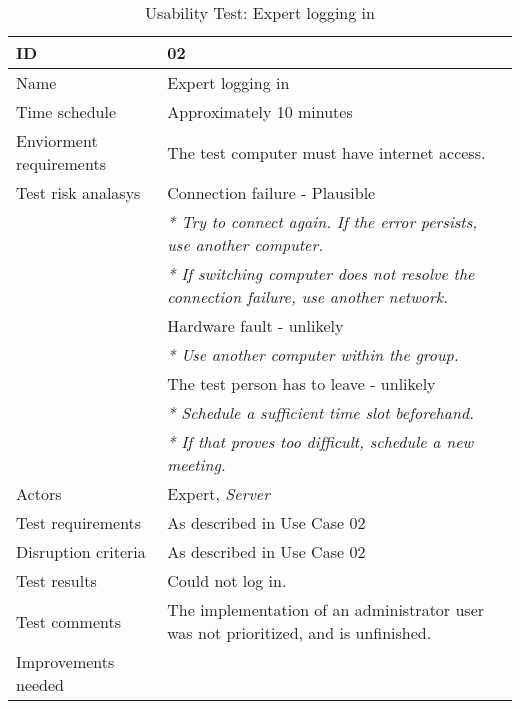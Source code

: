 {\footnotesize
\begin{table}[H]
\begin{tabular}{| p{5cm} | p{10cm} |}\hline
	\textbf{ID}	& \textbf{02} \\ \hline
	Name		& Expert logging in\\ \hline
	Time schedule	& Approximately 10 minutes\\ \hline
	Enviorment requirements 
		& The test computer must have internet access. \\ \hline
	Test risk analasys 
		& Connection failure - Plausible \\
		& \emph{* Try to connect again. If the error persists, use another computer.} \\
		& \emph{* If switching computer does not resolve the connection failure, use another network.}\\
		& Hardware fault - unlikely \\
		& \emph{* Use another computer within the group.} \\
		& The test person has to leave - unlikely \\
		& \emph{* Schedule a sufficient time slot beforehand.} \\
		& \emph{* If that proves too difficult, schedule a new meeting.}\\ \hline
	Actors	& Expert, \emph{Server}\\ \hline
	Test requirements & As described in Use Case 02 \\ \hline
	Disruption criteria & As described in Use Case 02  \\ \hline
	Test results & Could not log in.
		& \\ \hline
	Test comments & The implementation of an administrator user was not prioritized, and is unfinished.
		& \\ \hline
	Improvements needed
		& \\ \hline
\end{tabular}


\caption{Usability Test: Expert logging in}
\label{fig:usability_test_2}
\end{table}}


